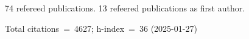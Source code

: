 74 refereed publications. 13 refeered publications as first author.

Total citations~=~4627; h-index~=~36 (2025-01-27)